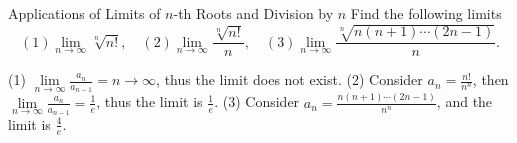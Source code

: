 \begin{example}{Applications of Limits of $n$-th Roots and Division by $n$}{}
  Find the following limits
  \begin{equation}
    (1) \lim \limits _{n \rightarrow \infty} \sqrt[n]{n!}, \quad
    (2) \lim \limits _{n \rightarrow \infty} \frac{\sqrt[n]{n!}}{n}, \quad
    (3) \lim \limits _{n \rightarrow \infty} \frac{\sqrt[n]{n(n+1)\cdots (2n-1)}}{n}.
  \end{equation}
\end{example}

\begin{solution}
  (1) $\lim \limits _{n \rightarrow \infty} \frac{a_n}{a_{n-1}} = n \rightarrow \infty$,
  thus the limit does not exist.
  (2) Consider $a_n = \frac{n!}{n^n}$, then $\lim \limits _{n \rightarrow
    \infty} \frac{a_n}{a_{n-1}} = \frac{1}{e}$, thus the limit is $\frac{1}{e}$.
  (3) Consider $a_n = \frac{n(n+1)\cdots(2n-1)}{n^n}$, and the limit is $\frac{4}{e}$.
\end{solution}

